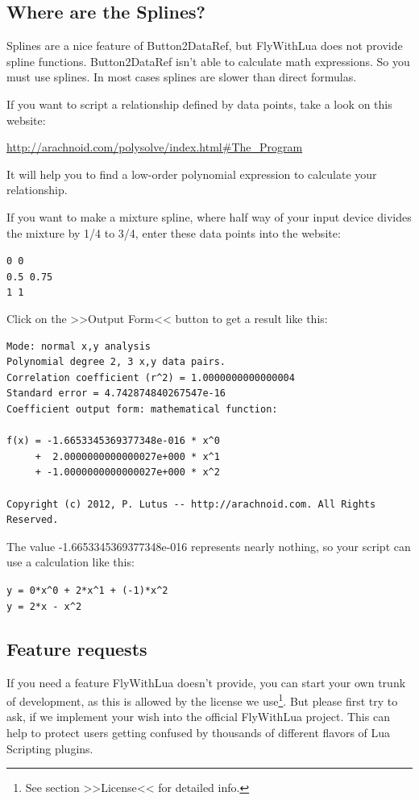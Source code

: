 \documentclass[11pt,parskip=half,a4paper]{scrartcl}
\begin{document}
\subsection{Where are the Splines?}

Splines are a nice feature of Button2DataRef, but FlyWithLua does not provide spline functions. Button2DataRef isn't able to calculate math expressions. So you must use splines. In most cases splines are slower than direct formulas.

If you want to script a relationship defined by data points, take a look on this website:

\url{http://arachnoid.com/polysolve/index.html#The_Program}

It will help you to find a low-order polynomial expression to calculate your relationship.

If you want to make a mixture spline, where half way of your input device divides the mixture by 1/4 to 3/4, enter these data points into the website:

\verb|0 0|\\
\verb|0.5 0.75|\\
\verb|1 1|

Click on the >>Output Form<< button to get a result like this:

\begin{lstlisting}[firstnumber=1]
Mode: normal x,y analysis
Polynomial degree 2, 3 x,y data pairs.
Correlation coefficient (r^2) = 1.0000000000000004
Standard error = 4.742874840267547e-16
Coefficient output form: mathematical function:

f(x) = -1.6653345369377348e-016 * x^0
     +  2.0000000000000027e+000 * x^1
     + -1.0000000000000027e+000 * x^2

Copyright (c) 2012, P. Lutus -- http://arachnoid.com. All Rights Reserved.
\end{lstlisting}

The value -1.6653345369377348e-016 represents nearly nothing, so your script can use a calculation like this:

\verb|y = 0*x^0 + 2*x^1 + (-1)*x^2|\\
\verb|y = 2*x - x^2|

\subsection{Feature requests}

If you need a feature FlyWithLua doesn't provide, you can start your own trunk of development, as this is allowed by the license we use\footnote{See section >>License<< for detailed info.}. But please first try to ask, if we implement your wish into the official FlyWithLua project. This can help to protect users getting confused by thousands of different flavors of Lua Scripting plugins.
\end{document}
